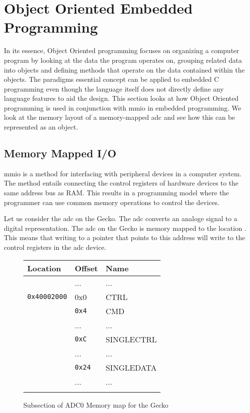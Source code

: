 \section{Object Oriented Embedded Programming}
\label{sec:back:oo}

In its essence, Object Oriented programming focuses on organizing a computer program by looking at the data the program operates on, grouping related data into objects and defining methods that operate on the data contained within the objects.
The paradigms essential concept can be applied to embedded C programming even though the language itself does not directly define any language features to aid the design.
This section looks at how Object Oriented programming is used in conjunction with \gls{mmio} in embedded programming.
We look at the memory layout of a memory-mapped \gls{adc} and see how this can be represented as an object.

\subsection{Memory Mapped I/O}
\label{ssec:memory_mapped_io}

\gls{mmio} is a method for interfacing with peripheral devices in a computer system.
The method entails connecting the control registers of hardware devices to the same address bus as RAM.
This results in a programming model where the programmer can use common memory operations to control the devices.

Let us consider the \gls{adc} on the Gecko.
The \gls{adc} converts an analoge signal to a digital representation.
The \gls{adc} on the Gecko is memory mapped to the location .
This means that writing to a pointer that points to this address will write to the control registers in the \gls{adc} device.

\begin{figure}[H]
  \centering
  \begin{tabular}{l|l|l|}
    \textbf{Location} & \textbf{Offset} & \textbf{Name} \\
    \hline
    &...&...\\
    \hline
    \hline
    \texttt{0x40002000} & 0x0 & CTRL\\
    \hline
    & \texttt{0x4} & CMD\\
    \hline
    &...&...\\
    \hline
    & \texttt{0xC} & SINGLECTRL\\
    \hline
    &...&...\\
    \hline
    & \texttt{0x24} & SINGLEDATA\\
    \hline
    &...&...\\
    \hline
    \hline
    &&\\
  \end{tabular}
  \caption{Subsection of ADC0 Memory map for the Gecko}
  \label{fig:back:memorymapped}
\end{figure}

